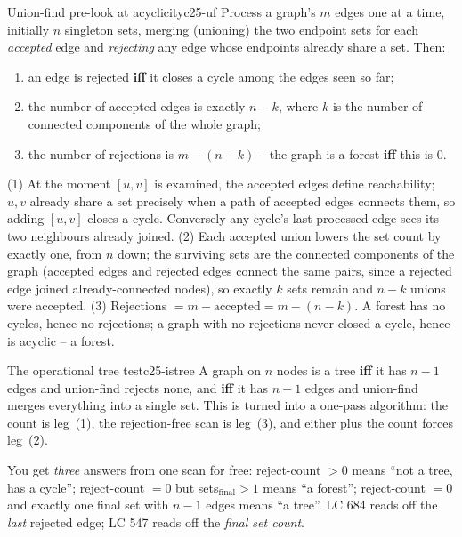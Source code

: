 \begin{proposition}{Union-find pre-look at acyclicity}{c25-uf}
Process a graph's $m$ edges one at a time, initially $n$ singleton sets, merging (unioning) the two
endpoint sets for each \emph{accepted} edge and \emph{rejecting} any edge whose endpoints already
share a set. Then:
\begin{enumerate}[nosep, leftmargin=1.6em]
  \item an edge is rejected \textbf{iff} it closes a cycle among the edges seen so far;
  \item the number of accepted edges is exactly $n-k$, where $k$ is the number of connected
        components of the whole graph;
  \item the number of rejections is $m-(n-k)$ -- the graph is a forest \textbf{iff} this is $0$.
\end{enumerate}
\end{proposition}
\begin{proofbox}
(1) At the moment $[u,v]$ is examined, the accepted edges define reachability; $u,v$ already share a
set precisely when a path of accepted edges connects them, so adding $[u,v]$ closes a cycle.
Conversely any cycle's last-processed edge sees its two neighbours already joined. (2) Each accepted
union lowers the set count by exactly one, from $n$ down; the surviving sets are the connected
components of the graph (accepted edges and rejected edges connect the same pairs, since a rejected
edge joined already-connected nodes), so exactly $k$ sets remain and $n-k$ unions were accepted.
(3) Rejections $=m-\text{accepted}=m-(n-k)$. A forest has no cycles, hence no rejections; a graph
with no rejections never closed a cycle, hence is acyclic -- a forest. \end{proofbox}

\begin{corollary}{The operational tree test}{c25-istree}
A graph on $n$ nodes is a tree \textbf{iff} it has $n-1$ edges and union-find rejects none, and
\textbf{iff} it has $n-1$ edges and union-find merges everything into a single set. This is
 turned into a one-pass algorithm: the count is leg~(1), the rejection-free scan
is leg~(3), and either plus the count forces leg~(2).
\end{corollary}
\begin{insightbox}
You get \emph{three} answers from one scan for free: reject-count $>0$ means ``not a tree, has a
cycle''; reject-count $=0$ but sets${}_\text{final}>1$ means ``a forest''; reject-count $=0$ and
exactly one final set with $n-1$ edges means ``a tree''. LC 684 reads off the \emph{last} rejected
edge; LC 547 reads off the \emph{final set count}.
\end{insightbox}

